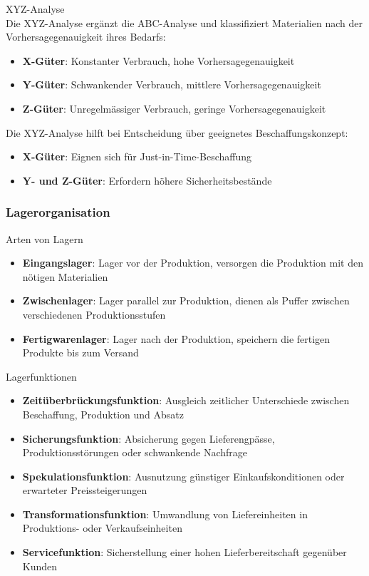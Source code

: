 \begin{definition}{XYZ-Analyse}\\
Die XYZ-Analyse ergänzt die ABC-Analyse und klassifiziert Materialien nach der Vorhersagegenauigkeit ihres Bedarfs:
\begin{itemize}
    \item \textbf{X-Güter}: Konstanter Verbrauch, hohe Vorhersagegenauigkeit
    \item \textbf{Y-Güter}: Schwankender Verbrauch, mittlere Vorhersagegenauigkeit
    \item \textbf{Z-Güter}: Unregelmässiger Verbrauch, geringe Vorhersagegenauigkeit
\end{itemize}

Die XYZ-Analyse hilft bei Entscheidung über geeignetes Beschaffungskonzept:
\begin{itemize}
    \item \textbf{X-Güter}: Eignen sich für Just-in-Time-Beschaffung
    \item \textbf{Y- und Z-Güter}: Erfordern höhere Sicherheitsbestände
\end{itemize}
\end{definition}

\subsubsection{Lagerorganisation}

\begin{definition}{Arten von Lagern}
\begin{itemize}
    \item \textbf{Eingangslager}: Lager vor der Produktion, versorgen die Produktion mit den nötigen Materialien
    \item \textbf{Zwischenlager}: Lager parallel zur Produktion, dienen als Puffer zwischen verschiedenen Produktionsstufen
    \item \textbf{Fertigwarenlager}: Lager nach der Produktion, speichern die fertigen Produkte bis zum Versand
\end{itemize}
\end{definition}

\begin{definition}{Lagerfunktionen}
\begin{itemize}
    \item \textbf{Zeitüberbrückungsfunktion}: Ausgleich zeitlicher Unterschiede zwischen Beschaffung, Produktion und Absatz
    \item \textbf{Sicherungsfunktion}: Absicherung gegen Lieferengpässe, Produktionsstörungen oder schwankende Nachfrage
    \item \textbf{Spekulationsfunktion}: Ausnutzung günstiger Einkaufskonditionen oder erwarteter Preissteigerungen
    \item \textbf{Transformationsfunktion}: Umwandlung von Liefereinheiten in Produktions- oder Verkaufseinheiten
    \item \textbf{Servicefunktion}: Sicherstellung einer hohen Lieferbereitschaft gegenüber Kunden
\end{itemize}
\end{definition}

